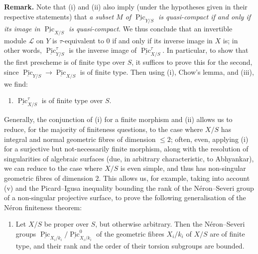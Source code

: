 \documentclass{article}
\providecommand{\tightlist}{%
  \setlength{\itemsep}{0pt}\setlength{\parskip}{0pt}}
\newenvironment{rmenv}[1]
  {\phantomsection\par\smallskip\noindent\textbf{#1.}\rmfamily}
  {\par\smallskip}
\newcommand{\oldpage}[1]{\marginpar{\footnotesize$\Big\vert$ \textit{p.~#1}}}
\theoremstyle{definition}
\theoremstyle{definition}
\theoremstyle{definition}
\theoremstyle{definition}
\theoremstyle{remark}
\begin{document}
\begin{rmenv}{Remark}
Note that (i) and (ii) also imply (under the hypotheses given in their respective statements) that \emph{a subset \(M\) of \(\underline{\operatorname{Pic}}_{Y/S}\) is quasi-compact if and only if its image in \(\underline{\operatorname{Pic}}_{X/S}\) is quasi-compact}.
We thus conclude that an invertible module \({\mathscr{L}}\) on \(Y\) is \(\tau\)-equivalent to \(0\) if and only if its inverse image in \(X\) is;
in other words, \(\underline{\operatorname{Pic}}_{Y/S}^\tau\) is the inverse image of \(\underline{\operatorname{Pic}}_{X/S}^\tau\).
In particular, to show that the first prescheme is of finite type over \(S\), it suffices to prove this for the second, since \(\underline{\operatorname{Pic}}_{Y/S}\to\underline{\operatorname{Pic}}_{X/S}\) is of finite type.
Then using (i), Chow's lemma, and (iii), we find:

\begin{enumerate}
\def\labelenumi{\alph{enumi}.}
\setcounter{enumi}{21}
\tightlist
\item
  \(\underline{\operatorname{Pic}}_{X/S}^\tau\) is of finite type over \(S\).
\end{enumerate}

Generally, the conjunction of (i) for a finite morphism and (ii) allows us to reduce, for the majority of finiteness questions, to the case where \(X/S\) has integral and normal geometric fibres of dimension \(\leqslant 2\);
often, even, applying (i) for a surjective but not-necessarily finite morphism, along with the resolution of singularities of algebraic surfaces (due, in arbitrary characteristic, to Abhyankar), we can reduce to the case where \(X/S\) is even simple, and thus has non-singular geometric fibres of dimension \(2\).
This allows us, for example, taking into account (v) and the Picard--Igusa inequality bounding the rank of the Néron--Severi group of a non-singular projective surface, to prove the following generalisation of the Néron finiteness theorem:

\begin{enumerate}
\def\labelenumi{\roman{enumi}.}
\setcounter{enumi}{5}
\tightlist
\item
  Let \(X/S\) be proper over \(S\), but otherwise arbitrary.
  \oldpage{C-09}Then the Néron--Severi groups \(\underline{\operatorname{Pic}}_{X_i/k_i}/\underline{\operatorname{Pic}}_{X_i/k_i}^0\) of the geometric fibres \(X_i/k_i\) of \(X/S\) are of finite type, and their rank and the order of their torsion subgroups are bounded.
\end{enumerate}


\end{rmenv}
\end{document}
